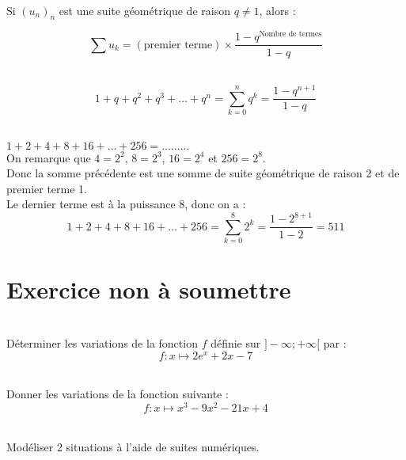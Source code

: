\documentclass[12pt,fleqn]{report} %
\begin{document}
\begin{proposition}\text{ }\\
	Si $(u_n)_n$ est une suite géométrique de raison $q \neq1$, alors :
	
	\[
	\sum u_k = (\text{premier terme}) \times \frac{1 - q^{\text{Nombre de termes}}}{1 - q}
	\] 
\end{proposition}

\begin{proposition}\text{ }\\
	\[
	1 + q + q^2 + q^3 + \dots + q^n = \sum_{k=0}^{n} q^k = \frac{1 - q^{n+1}}{1 - q}
	\]
\end{proposition}

\begin{example}\text{ }\\
	$	1 + 2 + 4 + 8 + 16 + \dots + 256 = \dots \dots \dots $ \\
	On remarque que $4 = 2^2$, $8 = 2^3$, $16 = 2^4$ et $256 = 2^8$.\\
	Donc la somme précédente est une somme de suite géométrique de raison 2 et de premier terme 1.\\ Le dernier terme est à la puissance 8, donc on a :
	\[
	1 + 2 + 4 + 8 + 16 + \dots + 256 = \sum_{k = 0}^8 2^k = \frac{1 - 2^{8 + 1}}{1 - 2} = 511
	\]
\end{example}

\chapter*{Exercice non à soumettre}
\begin{exercise}\label{Exercice 23}\text{ }\\
	Déterminer les variations de la fonction $f$ définie sur $]-\infty ; +\infty[$ par : 
	\[f : x \mapsto 2e^x+2x-7\]
\end{exercise}

\begin{exercise}\label{Exercice 40}\text{ }\\
	Donner les variations de la fonction suivante : \[f : x \mapsto x^3-9x^2-21x+4\]
\end{exercise}

\begin{exercise} \label{Exercice 50}\text{ }\\
	Modéliser 2 situations à l'aide de suites numériques.
\end{exercise}
\end{document}
